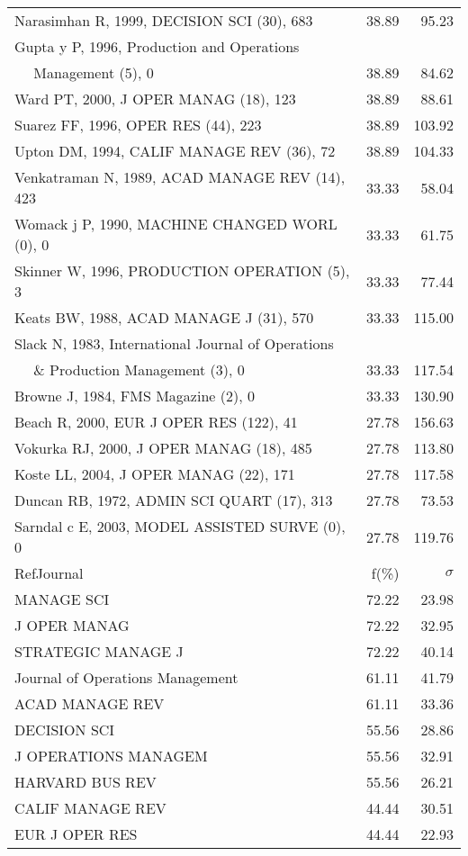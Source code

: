 \documentclass[a4paper,11pt]{report}
\begin{document}
\begin{landscape}
\begin{table}[!ht]
{\begin{tabular}{|l r r|}
Narasimhan R, 1999, DECISION SCI (30), 683 & 38.89 & 95.23\\
Gupta y P, 1996, Production and Operations &  & \\
$\quad$ Management (5), 0 & 38.89 & 84.62\\
Ward PT, 2000, J OPER MANAG (18), 123 & 38.89 & 88.61\\
Suarez FF, 1996, OPER RES (44), 223 & 38.89 & 103.92\\
Upton DM, 1994, CALIF MANAGE REV (36), 72 & 38.89 & 104.33\\
Venkatraman N, 1989, ACAD MANAGE REV (14), 423 & 33.33 & 58.04\\
Womack j P, 1990, MACHINE CHANGED WORL (0), 0 & 33.33 & 61.75\\
Skinner W, 1996, PRODUCTION OPERATION (5), 3 & 33.33 & 77.44\\
Keats BW, 1988, ACAD MANAGE J (31), 570 & 33.33 & 115.00\\
Slack N, 1983, International Journal of Operations &  & \\
$\quad$ \& Production Management (3), 0 & 33.33 & 117.54\\
Browne J, 1984, FMS Magazine (2), 0 & 33.33 & 130.90\\
Beach R, 2000, EUR J OPER RES (122), 41 & 27.78 & 156.63\\
Vokurka RJ, 2000, J OPER MANAG (18), 485 & 27.78 & 113.80\\
Koste LL, 2004, J OPER MANAG (22), 171 & 27.78 & 117.58\\
Duncan RB, 1972, ADMIN SCI QUART (17), 313 & 27.78 & 73.53\\
Sarndal c E, 2003, MODEL ASSISTED SURVE (0), 0 & 27.78 & 119.76\\
\hline
\hline
RefJournal & f(\%) & $\sigma$\\
\hline
MANAGE SCI & 72.22 & 23.98\\
J OPER MANAG & 72.22 & 32.95\\
STRATEGIC MANAGE J & 72.22 & 40.14\\
Journal of Operations Management & 61.11 & 41.79\\
ACAD MANAGE REV & 61.11 & 33.36\\
DECISION SCI & 55.56 & 28.86\\
J OPERATIONS MANAGEM & 55.56 & 32.91\\
HARVARD BUS REV & 55.56 & 26.21\\
CALIF MANAGE REV & 44.44 & 30.51\\
EUR J OPER RES & 44.44 & 22.93\\
\hline
\end{tabular}
}
\end{table}

\end{landscape}
\end{document}
